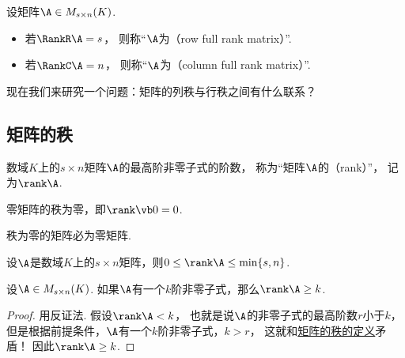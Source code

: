 \begin{definition}
设矩阵\(\A \in M_{s \times n}(K)\).
\begin{itemize}
	\item 若\(\RankR\A = s\)，
	则称“\(\A\)为（row full rank matrix）”.
	\item 若\(\RankC\A = n\)，
	则称“\(\A\)为（column full rank matrix）”.
\end{itemize}
\end{definition}

现在我们来研究一个问题：矩阵的列秩与行秩之间有什么联系？

\subsection{矩阵的秩}
\begin{definition}\label{definition:线性方程组.矩阵的秩的定义}
数域\(K\)上的\(s \times n\)矩阵\(\A\)的最高阶非零子式的阶数，
称为“矩阵\(\A\)的（rank）”，
记为\(\rank\A\).
\end{definition}

\begin{proposition}\label{theorem:向量空间.零矩阵的秩为零}
零矩阵的秩为零，即\(\rank\vb0 = 0\).
\end{proposition}
\begin{proposition}\label{theorem:向量空间.秩为零的矩阵必为零矩阵}
秩为零的矩阵必为零矩阵.
\end{proposition}

\begin{property}\label{theorem:线性方程组.矩阵的秩的性质2}
设\(\A\)是数域\(K\)上的\(s \times n\)矩阵，则\(0 \leq \rank\A \leq \min\{s,n\}\).
\end{property}

\begin{theorem}
设\(\A\in M_{s \times n}(K)\).
如果\(\A\)有一个\(k\)阶非零子式，那么\(\rank\A\geq k\).
\begin{proof}
用反证法.
假设\(\rank\A<k\)，
也就是说\(\A\)的非零子式的最高阶数\(r\)小于\(k\)，
但是根据前提条件，\(\A\)有一个\(k\)阶非零子式，\(k>r\)，
这就和\hyperref[definition:线性方程组.矩阵的秩的定义]{矩阵的秩的定义}矛盾！
因此\(\rank\A\geq k\).
\end{proof}
\end{theorem}

